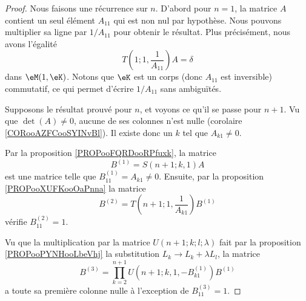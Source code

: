 \begin{proof}
    Nous faisons une récurrence sur \( n\). D'abord pour \( n=1\), la matrice \( A\) contient un seul élément \( A_{11}\) qui est non nul par hypothèse. Nous pouvons multiplier sa ligne par \( 1/A_{11}\) pour obtenir le résultat. Plus précisément, nous avons l'égalité
    \begin{equation}
        T(1;1,\frac{1}{ A_{11} })A=\delta
    \end{equation}
    dans \( \eM(1, \eK)\). Notons que \( \eK\) est un corps (donc \( A_{11}\) est inversible) commutatif, ce qui permet d'écrire \( 1/A_{11}\) sans ambiguïtés.

    Supposons le résultat prouvé pour \( n\), et voyons ce qu'il se passe pour \( n+1\). Vu que \( \det(A)\neq 0\), aucune de ses colonnes n'est nulle (corolaire \ref{CORooAZFCooSYINvBl}). Il existe donc un \( k\) tel que \( A_{k1}\neq 0\).

    Par la proposition \ref{PROPooFQRDooRPfuxk}, la matrice
    \begin{equation}
        B^{(1)}=S(n+1;k,1)A
    \end{equation}
    est une matrice telle que \( B^{(1)}_{11}=A_{k1}\neq 0\). Ensuite, par la proposition \ref{PROPooXUFKooOaPnna} la matrice
    \begin{equation}
        B^{(2)}=T(n+1;1,\frac{1}{ A_{k1} })B^{(1)}
    \end{equation}
    vérifie \( B^{(2)}_{11}=1\). 

    Vu que la multiplication par la matrice \( U(n+1;k;l;\lambda)\) fait par la proposition \ref{PROPooPYNHooLbeVhj} la substitution \( L_k\to L_{k}+\lambda L_l\), la matrice
    \begin{equation}
        B^{(3)}=\prod_{k=2}^{n+1}U(n+1;k,1,-B^{(1)}_{k1})B^{(1)}
    \end{equation}
    a toute sa première colonne nulle à l'exception de \( B^{(3)}_{11}=1\).


\end{proof}
